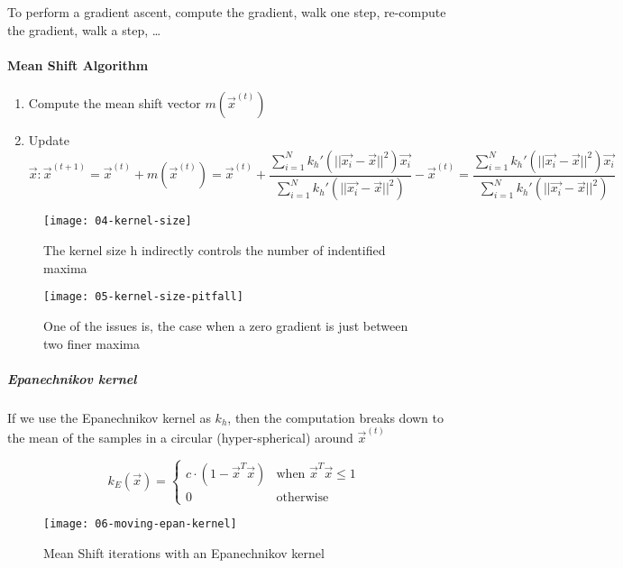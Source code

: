 To perform a gradient ascent, compute the gradient, walk one step, re-compute the gradient, walk a step, \ldots

\paragraph{Mean Shift Algorithm}
\begin{enumerate}
  \item Compute the mean shift vector $m(\vec{x}^{(t)})$
  \item Update $\vec{x}:\vec{x}^{(t+1)} = \vec{x}^{(t)} + m(\vec{x}^{(t)}) = \vec{x}^{(t)} + \dfrac{\sum_{i=1}^N k_h'(||\vec{x_i} - \vec{x}||^2) \vec{x_i}}{\sum_{i=1}^N k_h'(||\vec{x_i} - \vec{x}||^2)} - \vec{x}^{(t)}= \dfrac{\sum_{i=1}^N k_h'(||\vec{x_i} - \vec{x}||^2) \vec{x_i}}{\sum_{i=1}^N k_h'(||\vec{x_i} - \vec{x}||^2)}$
\end{enumerate}

\begin{figure}[H] 
	\centering
	\begin{minipage}[b]{0.4\textwidth}
		\texttt{[image: 04-kernel-size]}
		\caption{The kernel size h indirectly controls the number of indentified maxima}
	\end{minipage}
	\begin{minipage}[b]{0.4\textwidth}
		\texttt{[image: 05-kernel-size-pitfall]}
		\caption{One of the issues is, the case when a zero gradient is just between two finer maxima}	
		\label{mean-shift-issue}	
	\end{minipage}
\end{figure}

\subparagraph{Epanechnikov kernel}
If we use the Epanechnikov kernel as $k_h$, then the computation breaks down to the mean of the samples in a circular (hyper-spherical) around $\vec{x}^{(t)}$

\begin{equation*}
  k_E(\vec{x}) = \begin{cases}
    c \cdot (1 - \vec{x}^T \vec{x})&\text{when } \vec{x}^T \vec{x} \le 1\\
    0 &\text{otherwise}
  \end{cases}
\end{equation*}

\begin{figure}[H]
  \centering
  \texttt{[image: 06-moving-epan-kernel]}
  \caption{Mean Shift iterations with an Epanechnikov kernel}
\end{figure}

